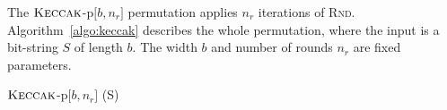 The $\textsc{Keccak}$-p$\lbrack b, n_r \rbrack$ permutation applies $n_r$ iterations of \textsc{Rnd}.
Algorithm~\ref{algo:keccak} describes the whole permutation, where the input is a bit-string $S$ of length $b$. The width $b$ and number of rounds $n_r$ are fixed parameters.
\begin{algorithm}[H]
\caption{$\textsc{Keccak}$-p$\lbrack b, n_r \rbrack$ (S)}
\label{algo:keccak}
\begin{algorithmic}[1]
  \EndFor{}
\end{algorithmic}
\end{algorithm}
